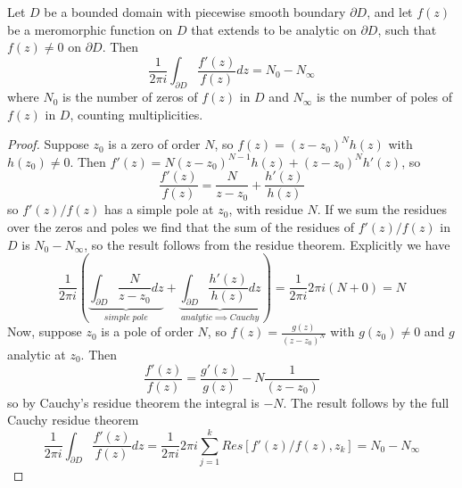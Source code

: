 \begin{theorem}
    Let $D$ be a bounded domain with piecewise smooth boundary $\partial D$, and let $f(z)$ be a meromorphic function on $D$ that extends to be analytic on $\partial D$, such that $f(z) \neq 0$ on $\partial D$. Then \begin{equation*}
        \frac{1}{2\pi i}\int_{\partial D}\frac{f'(z)}{f(z)}dz = N_0 - N_{\infty}
    \end{equation*}
    where $N_0$ is the number of zeros of $f(z)$ in $D$ and $N_{\infty}$ is the number of poles of $f(z)$ in $D$, counting multiplicities.
\end{theorem}
\begin{proof}
    Suppose $z_0$ is a zero of order $N$, so $f(z) = (z-z_0)^Nh(z)$ with $h(z_0) \neq 0$. Then $f'(z) = N(z-z_0)^{N-1}h(z)+(z-z_0)^Nh'(z)$, so \begin{equation*}
        \frac{f'(z)}{f(z)} = \frac{N}{z-z_0} + \frac{h'(z)}{h(z)}
    \end{equation*}
    so $f'(z)/f(z)$ has a simple pole at $z_0$, with residue $N$. If we sum the residues over the zeros and poles we find that the sum of the residues of $f'(z)/f(z)$ in $D$ is $N_0-N_{\infty}$, so the result follows from the residue theorem. Explicitly we have \begin{equation*}
        \frac{1}{2\pi i}\left(\underbrace{\int_{\partial D}\frac{N}{z-z_0}dz}_{simple\;pole} + \underbrace{\int_{\partial D}\frac{h'(z)}{h(z)}dz}_{analytic\implies Cauchy}\right) = \frac{1}{2\pi i}2\pi i(N+0) = N
    \end{equation*}
    Now, suppose $z_0$ is a pole of order $N$, so $f(z) = \frac{g(z)}{(z-z_0)^N}$ with $g(z_0) \neq 0$ and $g$ analytic at $z_0$. Then \begin{equation*}
        \frac{f'(z)}{f(z)} = \frac{g'(z)}{g(z)}-N\frac{1}{(z-z_0)}
    \end{equation*}
    so by Cauchy's residue theorem the integral is $-N$. The result follows by the full Cauchy residue theorem \begin{equation*}
        \frac{1}{2\pi i}\int_{\partial D}\frac{f'(z)}{f(z)}dz = \frac{1}{2\pi i}2\pi i\sum_{j=1}^kRes[f'(z)/f(z),z_k] = N_0 - N_{\infty}
    \end{equation*}
\end{proof}

